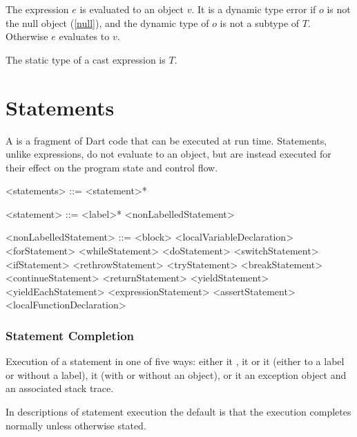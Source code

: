\documentclass[makeidx]{article}
\begin{document}
{\LMHash{}%
The expression $e$ is evaluated to an object $v$.
It is a dynamic type error if $o$ is not the null object (\ref{null}),
and the dynamic type of $o$ is not a subtype of $T$.
Otherwise $e$ evaluates to $v$.

\LMHash{}%
The static type of a cast expression  is $T$.


\section{Statements}

\LMHash{}%
A  is a fragment of Dart code that can be executed at run time.
Statements, unlike expressions, do not evaluate to an object,
but are instead executed for their effect on the program state and control flow.

\begin{grammar}
<statements> ::= <statement>*

<statement> ::= <label>* <nonLabelledStatement>

<nonLabelledStatement> ::= <block>
  \alt <localVariableDeclaration>
  \alt <forStatement>
  \alt <whileStatement>
  \alt <doStatement>
  \alt <switchStatement>
  \alt <ifStatement>
  \alt <rethrowStatement>
  \alt <tryStatement>
  \alt <breakStatement>
  \alt <continueStatement>
  \alt <returnStatement>
  \alt <yieldStatement>
  \alt <yieldEachStatement>
  \alt <expressionStatement>
  \alt <assertStatement>
  \alt <localFunctionDeclaration>
\end{grammar}


\subsubsection{Statement Completion}

\LMHash{}%
Execution of a statement 
in one of five ways:
either it
,
it 
or it 
(either to a label or without a label),
it  (with or without an object),
or it 
an exception object and an associated stack trace.

\LMHash{}%
In descriptions of statement execution the default is that
the execution completes normally unless otherwise stated.

}
\end{document}
